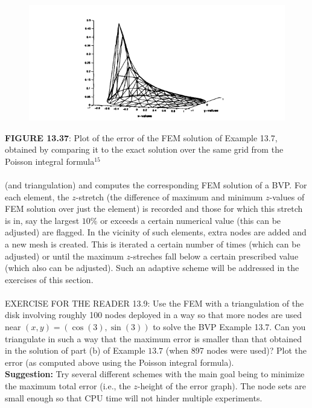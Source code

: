\documentclass[../main.tex]{subfiles}
\begin{document}
\begin{figure}[H]
\includegraphics[width=0.9\linewidth]{23}
	\centering
	\label{pfig:ch13_23}
\end{figure}
\textbf{FIGURE 13.37}: Plot of the error of the FEM solution of Example 13.7, obtained by 
comparing it to the exact solution over the same grid from the Poisson integral formula$^{15}$ 
\\
\\
(and triangulation) and computes the corresponding FEM solution of a BVP. For each element, the $z$-stretch (the difference of maximum and minimum $z$-values of FEM solution over just the element) is recorded and those for which this stretch is in, say the largest $10 \%$ or exceeds a certain numerical value (this can be adjusted) are flagged. In the vicinity of such elements, extra nodes are added and a new mesh is created. This is iterated a certain number of times (which can be adjusted) or until the maximum $z$-streches fall below a certain prescribed value (which also can be adjusted). Such an adaptive scheme will be addressed in the exercises of this section.
\\
\\
EXERCISE FOR THE READER 13.9: Use the FEM with a triangulation of the disk involving roughly 100 nodes deployed in a way so that more nodes are used near $(x, y)=(\cos (3), \sin (3))$ to solve the BVP Example 13.7. Can you triangulate in such a way that the maximum error is smaller than that obtained in the solution of part (b) of Example $13.7$ (when 897 nodes were used)? Plot the error (as computed above using the Poisson integral formula).\\
\textbf{Suggestion:} Try several different schemes with the main goal being to minimize the maximum total error (i.e., the $z$-height of the error graph). The node sets are small enough so that CPU time will not hinder multiple experiments.\\
\end{document}
